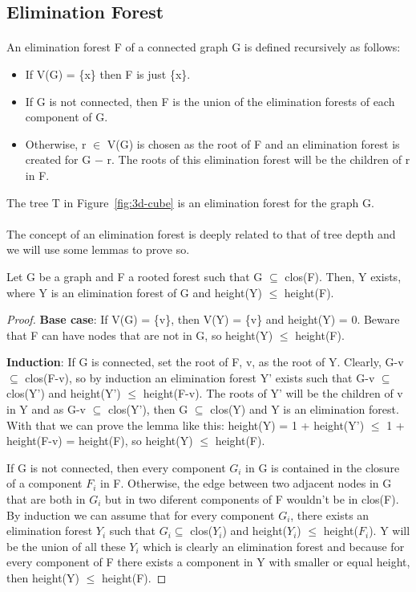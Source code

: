 \subsection{Elimination Forest}
\paragraph{}
An elimination forest F of a connected graph G is defined recursively as follows:
\begin{itemize}
  \item If V(G) = \{x\} then F is just \{x\}.
  \item If G is not connected, then F is the union of the elimination forests of each component of G.
  \item Otherwise, r $\in$ V(G) is chosen as the root of F and an elimination forest is created for G $-$ r. The roots of this elimination forest will be the children of r in F.
\end{itemize}
The tree T in Figure~\ref{fig:3d-cube} is an elimination forest for the graph G.

\paragraph{}
The concept of an elimination forest is deeply related to that of tree depth and we will use some lemmas to prove so.

\begin{lemma}
\label{lema:min-ET}
Let G be a graph and F a rooted forest such that G $\subseteq$ clos(F). Then, Y exists, where Y is an elimination forest of G and height(Y) $\leq$ height(F).
\end{lemma}

\begin{proof}
  \item \textbf{Base case}: If V(G) = \{v\}, then V(Y) = \{v\} and height(Y) = 0. Beware that F can have nodes that are not in G, so height(Y) $\leq$ height(F).
  \item \textbf{Induction}: If G is connected, set the root of F, v, as the root of Y. Clearly, G-v $\subseteq$ clos(F-v), so by induction an elimination forest Y' exists such that G-v $\subseteq$ clos(Y') and height(Y') $\leq$ height(F-v). The roots of Y' will be the children of v in Y and as G-v $\subseteq$ clos(Y'), then G $\subseteq$ clos(Y) and Y is an elimination forest. With that we can prove the lemma like this: height(Y) = 1 + height(Y') $\leq$ 1 + height(F-v) = height(F), so height(Y) $\leq$ height(F).
  
  If G is not connected, then every component $G_i$ in G is contained in the closure of a component $F_i$ in F. Otherwise, the edge between two adjacent nodes in G that are both in $G_i$ but in two diferent components of F wouldn't be in clos(F). By induction we can assume that for every component $G_i$, there exists an elimination forest $Y_i$ such that $G_i \subseteq$ clos($Y_i$) and height($Y_i$) $\leq$ height($F_i$). Y will be the union of all these $Y_i$ which is clearly an elimination forest and because for every component of F there exists a component in Y with smaller or equal height, then height(Y) $\leq$ height(F).
\end{proof}

